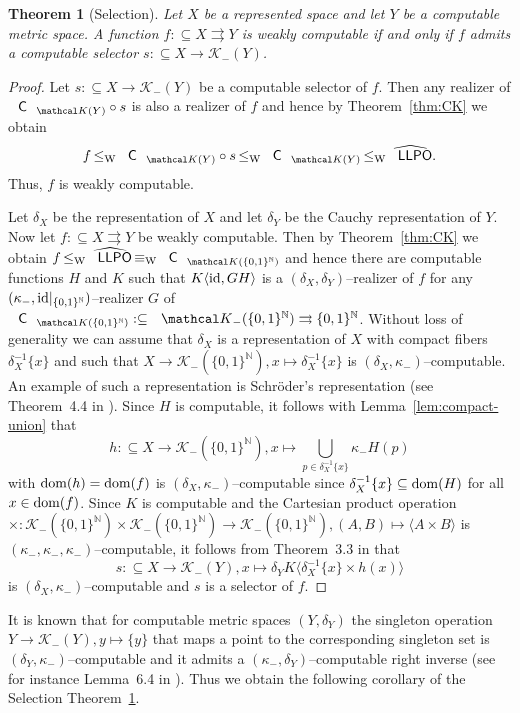 \documentclass[jsl,10pt]{noasl}
\def\KK{{\mathcal K}}
\def\IN{{\mathbb{N}}}
\def\In{\subseteq}
\def\mto{\rightrightarrows}
\def\id{{\rm id}}
\def\dom{{\rm dom}}
\def\LLPO{\text{\rm\sffamily LLPO}}
\def\C{\text{\rm\sffamily C}}
\def\LLPO{\text{\rm\sffamily LLPO}}
\def\leqW{\mathop{\leq_{\mathrm{W}}}}
\def\equivW{\mathop{\equiv_{\mathrm{W}}}}
\newtheorem{theorem}[proposition]{Theorem}
\begin{document}
\begin{theorem}[Selection]
\label{thm:selection}
Let $X$ be a represented space and let $Y$ be a computable metric space.
A function $f:\In X\mto Y$ is weakly computable if and only if $f$ admits a computable
selector $s:\In X\to\KK_-(Y)$.
\end{theorem}
\begin{proof}
Let $s:\In X\to\KK_-(Y)$ be a computable selector of $f$. Then any realizer of 
$\C_{\KK(Y)}\circ s$ is also a realizer of $f$ and hence by Theorem~\ref{thm:CK}
we obtain
\[f\leqW\C_{\KK(Y)}\circ s\leqW\C_{\KK(Y)}\leqW\widehat{\LLPO}.\]
Thus, $f$ is weakly computable.

Let $\delta_X$ be the representation of $X$ and let $\delta_Y$ be the Cauchy representation
of $Y$.  
Now let $f:\In X\mto Y$ be weakly computable. Then by Theorem~\ref{thm:CK} we obtain
$f\leqW\widehat{\LLPO}\equivW\C_{\KK(\{0,1\}^\IN)}$
and hence there are computable functions $H$ and $K$ such that
$K\langle\id,GH\rangle$ is a $(\delta_X,\delta_Y)$--realizer of $f$ for any 
$(\kappa_-,\id|_{\{0,1\}^\IN})$--realizer $G$ of $\C_{\KK(\{0,1\}^\IN)}:\In\KK_-(\{0,1\}^\IN)\mto\{0,1\}^\IN$. 
Without loss of generality we can assume that $\delta_X$ is a representation
of $X$ with compact fibers $\delta_X^{-1}\{x\}$ and such that 
$X\to\KK_-(\{0,1\}^\IN),x\mapsto\delta_X^{-1}\{x\}$ is $(\delta_X,\kappa_-)$--computable.
An example of such a representation is Schr\"oder's representation (see Theorem~4.4 in \cite{Wei03}).
Since $H$ is computable, it follows with Lemma~\ref{lem:compact-union} that
\[h:\In X\to\KK_-(\{0,1\}^\IN),x\mapsto\bigcup_{p\in\delta_X^{-1}\{x\}}\kappa_-H(p)\]
with $\dom(h)=\dom(f)$ is $(\delta_X,\kappa_-)$--computable since $\delta_X^{-1}\{x\}\In\dom(H)$ for all $x\in\dom(f)$.
Since $K$ is computable and the Cartesian product operation 
$\times:\KK_-(\{0,1\}^\IN)\times\KK_-(\{0,1\}^\IN)\to\KK_-(\{0,1\}^\IN),(A,B)\mapsto \langle A\times B\rangle$
is $(\kappa_-,\kappa_-,\kappa_-)$--computable,
it follows from Theorem~3.3 in \cite{Wei03} that
\[s:\In X\to\KK_-(Y),x\mapsto\delta_YK\langle \delta_X^{-1}\{x\}\times h(x)\rangle\]
is $(\delta_X,\kappa_-)$--computable and $s$ is a selector of $f$.
\end{proof}

It is known that for computable metric spaces $(Y,\delta_Y)$ the singleton operation 
$Y\to\KK_-(Y),y\mapsto\{y\}$ that maps a point to the corresponding singleton set 
is $(\delta_Y,\kappa_-)$--computable and it admits a $(\kappa_-,\delta_Y)$--computable
right inverse (see for instance Lemma~6.4 in \cite{Bra08}). 
Thus we obtain the following corollary of the Selection Theorem~\ref{thm:selection}.
\end{document}
